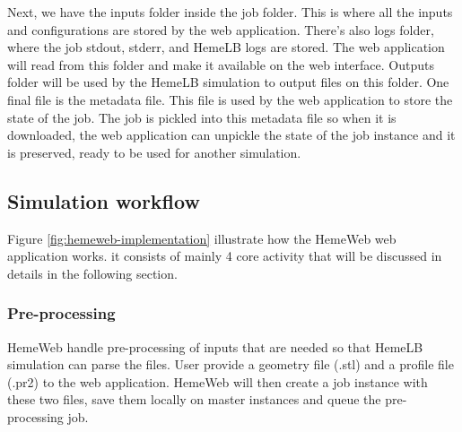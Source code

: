 Next, we have the inputs folder inside the job folder. This is where all the inputs and configurations are stored by the web application. There's also logs folder, where the job stdout, stderr, and HemeLB logs are stored. The web application will read from this folder and make it available on the web interface. Outputs folder will be used by the HemeLB simulation to output files on this folder. One final file is the metadata file. This file is used by the web application to store the state of the job. The job is pickled into this metadata file so when it is downloaded, the web application can unpickle the state of the job instance and it is preserved, ready to be used for another simulation.



\subsection{Simulation workflow}

\vspace{1cm}

\noindent%
\begin{minipage}{\linewidth}%
\label{fig:hemeweb-implementation}%
\end{minipage}

\vspace{1cm}

Figure \ref{fig:hemeweb-implementation} illustrate how the HemeWeb web application works. it consists of mainly 4 core activity that will be discussed in details in the following section.

\subsubsection{Pre-processing}

HemeWeb handle pre-processing of inputs that are needed so that HemeLB simulation can parse the files. User provide a geometry file (.stl) and a profile file (.pr2) to the web application. HemeWeb will then create a job instance with these two files, save them locally on master instances and queue the pre-processing job.

